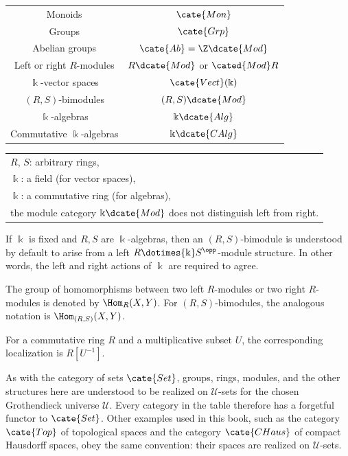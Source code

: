 \begin{center}\small \begin{tabular}{|c|c|}\hline
	Monoids & $\cate{Mon}$ \\
	Groups &  $\cate{Grp}$ \\
	Abelian groups & $\cate{Ab} = \Z\dcate{Mod}$ \\
	Left or right $R$-modules & $R\dcate{Mod}$ or $\cated{Mod}R$ \\
	$\Bbbk$-vector spaces & $\cate{Vect}(\Bbbk)$ \\
	$(R,S)$-bimodules & $(R,S)\dcate{Mod}$ \\
	$\Bbbk$-algebras & $\Bbbk\dcate{Alg}$ \\
	Commutative $\Bbbk$-algebras & $\Bbbk\dcate{CAlg}$
	\\ \hline
\end{tabular} \quad \begin{tabular}{l}
	$R$, $S$: arbitrary rings, \\
	$\Bbbk$: a field (for vector spaces), \\
	$\Bbbk$: a commutative ring (for algebras), \\
	the module category $\Bbbk\dcate{Mod}$ does not distinguish left from right.
\end{tabular}\end{center}

If $\Bbbk$ is fixed and $R,S$ are $\Bbbk$-algebras, then an $(R,S)$-bimodule is understood by default to arise from a left $R\dotimes{\Bbbk}S^{\opp}$-module structure. In other words, the left and right actions of $\Bbbk$ are required to agree.

The group of homomorphisms between two left $R$-modules or two right $R$-modules is denoted by $\Hom_R(X,Y)$. For $(R,S)$-bimodules, the analogous notation is $\Hom_{(R,S)}(X,Y)$.

For a commutative ring $R$ and a multiplicative subset $U$, the corresponding localization is $R[U^{-1}]$.

As with the category of sets $\cate{Set}$, groups, rings, modules, and the other structures here are understood to be realized on $\mathcal U$-sets for the chosen Grothendieck universe $\mathcal U$. Every category in the table therefore has a forgetful functor to $\cate{Set}$. Other examples used in this book, such as the category $\cate{Top}$ of topological spaces and the category $\cate{CHaus}$ of compact Hausdorff spaces, obey the same convention: their spaces are realized on $\mathcal U$-sets.

